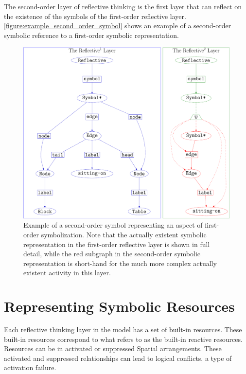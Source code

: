 The second-order layer of reflective thinking is the first layer that
can reflect on the existence of the symbols of the first-order
reflective layer.
{\mbox{\autoref{figure:example_second_order_symbol}}} shows an example
of a second-order symbolic reference to a first-order symbolic
representation.
\begin{figure}
\center
\includegraphics[width=12cm]{gfx/example_second_order_symbol}
\caption[Example of a second-order symbol representing first-order
  symbolization activity.]{Example of a second-order symbol
  representing an aspect of first-order symbolization.  Note that the
  actually existent symbolic representation in the first-order
  reflective layer is shown in full detail, while the red subgraph in
  the second-order symbolic representation is short-hand for the much
  more complex actually existent activity in this layer.}
\label{figure:example_second_order_symbol}
\end{figure}

\section{Representing Symbolic Resources}

Each reflective thinking layer in the model has a set of built-in
resources.  These built-in resources correspond to what
\cite{minsky:2006} refers to as the built-in reactive resources.
Resources can be in activated or suppressed Spatial arrangements.
These activated and suppressed relationships can lead to logical
conflicts, a type of activation failure.

